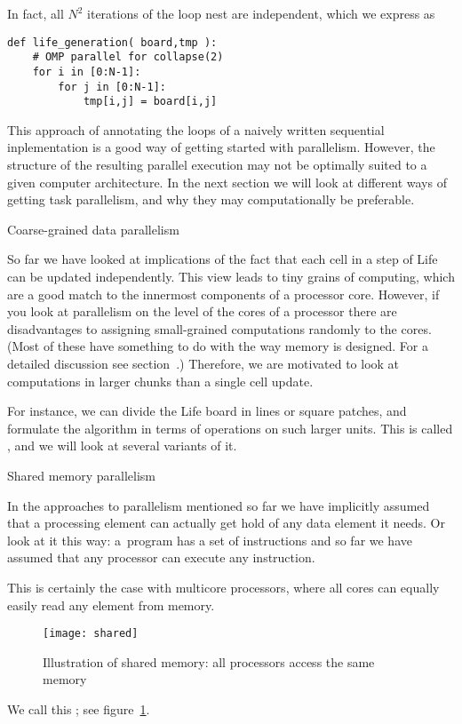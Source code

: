 In fact, all $N^2$ iterations of the  loop nest are independent,
which we express as
\begin{verbatim}
def life_generation( board,tmp ):
    # OMP parallel for collapse(2)
    for i in [0:N-1]:
        for j in [0:N-1]:
            tmp[i,j] = board[i,j]
\end{verbatim}

This approach of annotating the loops of a naively written sequential 
inplementation is a good way of getting started with parallelism.
However, the structure of the resulting parallel execution may not be
optimally suited to a given computer architecture. In the next section
we will look at different ways of getting task parallelism,
and why they may computationally be preferable.

 {Coarse-grained data parallelism}

So far we have looked at implications of the fact that each cell in a
step of Life can be updated independently. This view leads to tiny grains
of computing, which are a good match to the innermost components of
a processor core. However, if you look at parallelism on the level
of the cores of a processor there are disadvantages to 
assigning small-grained computations randomly to the cores. 
(Most of these have something to do with the way memory is designed.
For a detailed discussion see section~.)
Therefore, we are motivated to look at computations in 
larger chunks than  a single cell
update. 

For instance, we can divide the Life board in lines or square patches,
and formulate the algorithm in terms of operations on such larger units.
This is called , and we will look
at several variants of it.

 {Shared memory parallelism}
\label{sec:shared}

In the approaches to parallelism mentioned so far we have 
implicitly assumed that a processing element can actually get hold of any data
element it needs. Or look at it this way: a~program has a set of instructions
and so far we have assumed that any processor can execute any instruction.

This is certainly the case with multicore processors,
where all cores can equally easily read any element from memory.
\begin{figure}[ht]
  \texttt{[image: shared]}
  \caption{Illustration of shared memory: all processors access the
    same memory}
  \label{fig:shared}
\end{figure}
We call this ; see figure~\ref{fig:shared}.

